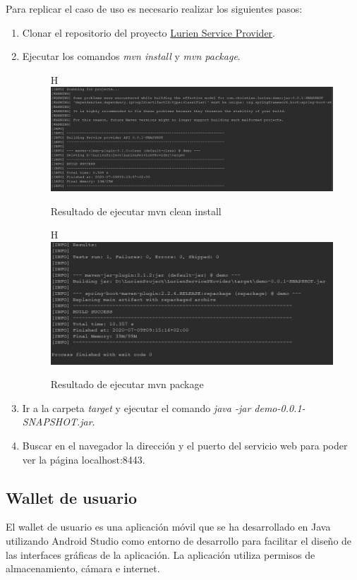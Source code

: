 \documentclass[12pt]{report}
\begin{document}
Para replicar el caso de uso es necesario realizar los siguientes pasos:

\begin{enumerate}
\item Clonar el repositorio del proyecto \href{https://github.com/ChristianTaidi/LurienServicePRovider}{Lurien Service Provider}.
\item Ejecutar los comandos \textit{mvn install} y \textit{mvn package}.
\begin{figure}{H}
\includegraphics[width=1\textwidth]{mvn-clean}
\caption{Resultado de ejecutar mvn clean install}
\end{figure}

\begin{figure}{H}
\includegraphics[width=1\textwidth]{mvn-package-result}
\caption{Resultado de ejecutar mvn package }
\end{figure}

\item Ir a la carpeta \textit{target} y ejecutar el comando \textit{java -jar demo-0.0.1-SNAPSHOT.jar}.
\item Buscar en el navegador la dirección y el puerto del servicio web para poder ver la página localhost:8443.
\end{enumerate}

\subsection{Wallet de usuario}
El wallet de usuario es una aplicación móvil que se ha desarrollado en Java utilizando Android Studio como entorno de desarrollo para facilitar el diseño de las interfaces gráficas de la aplicación. La aplicación utiliza permisos de almacenamiento, cámara e internet.
\end{document}
